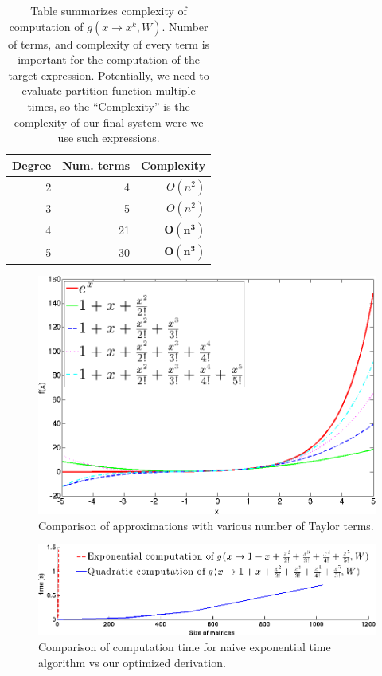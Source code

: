 \begin{table}
\tiny
\centering
\begin{tabular}{rrr}
\hline
Degree & Num. terms & Complexity \\
\hline
2 & 4 & $O(n^2)$\\
3 & 5 & $O(n^2)$\\
4 & 21 & $\mathbf{O(n^3)}$\\
5 & 30 & $\mathbf{O(n^3)}$\\
\hline
\end{tabular}
\caption{Table summarizes complexity of computation of $g(x \rightarrow x^k, W)$. 
Number of terms, and complexity of every term is important for the computation of the target expression.
Potentially, we need to evaluate partition function multiple times, so the ``Complexity''
is the complexity of our final system were we use such expressions.} 
\label{eval}
\end{table}

\begin{figure}[h]
\centering
\includegraphics[scale=0.2]{img/approximations.png}
\caption{Comparison of approximations with various number of Taylor terms.}
\label{approximations}
\end{figure}



\begin{figure}[h]
\centering
\includegraphics[scale=0.24]{img/time_approx.png}
\caption{Comparison of computation time for naive exponential time algorithm vs our optimized derivation.}
\label{time_approx}
\end{figure}


